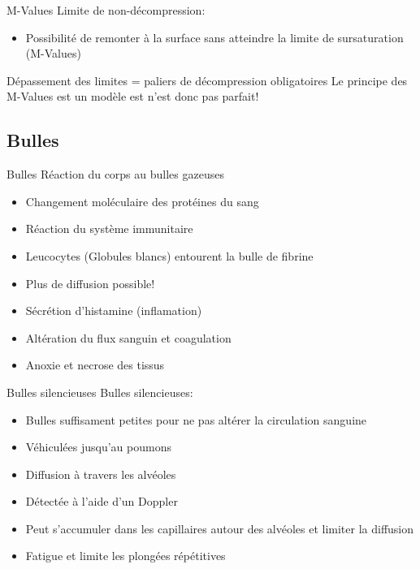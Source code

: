 \begin{frame}{M-Values}
	Limite de non-décompression:
	\begin{itemize}
		\item Possibilité de remonter à la surface sans atteindre la limite de sursaturation (M-Values)
	\end{itemize}
	\vfill
	Dépassement des limites = paliers de décompression obligatoires
	\vfill
	Le principe des M-Values est un modèle est n'est donc pas parfait!
\end{frame}

\subsection{Bulles}
\begin{frame}{Bulles}
	Réaction du corps au bulles gazeuses
	\begin{itemize}
		\item Changement moléculaire des protéines du sang
		\item Réaction du système immunitaire
		\item Leucocytes (Globules blancs) entourent la bulle de fibrine
		\item Plus de diffusion possible!
		\item Sécrétion d'histamine (inflamation)
		\item Altération du flux sanguin et coagulation
		\item Anoxie et necrose des tissus
	\end{itemize}
\end{frame}

\begin{frame}{Bulles silencieuses}  
	Bulles silencieuses:
	\begin{itemize}
		\item Bulles suffisament petites pour ne pas altérer la circulation sanguine
		\item Véhiculées jusqu'au poumons
		\item Diffusion à travers les alvéoles
		\item Détectée à l'aide d'un Doppler
		\item Peut s'accumuler dans les capillaires autour des alvéoles et limiter la diffusion
		\item Fatigue et limite les plongées répétitives
	\end{itemize}
\end{frame}

